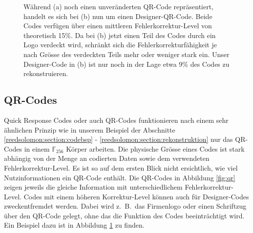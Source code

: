 \begin{figure}
	\centering
	\caption{Während (a) noch einen unveränderten QR-Code repräsentiert, handelt es sich bei (b) nun um einen Designer-QR-Code. Beide Codes verfügen über einen mittleren Fehlerkorrektur-Level von theoretisch 15\%. Da bei (b) jetzt einen Teil des Codes durch ein Logo verdeckt wird, schränkt sich die Fehlerkorrekturfähigkeit je nach Grösse des verdeckten Teils mehr oder weniger stark ein. Unser Designer-Code in (b) ist nur noch in der Lage etwa 9\% des Codes zu rekonstruieren.}
	\label{fig:designqr}
\end{figure}

\subsection{QR-Codes}
%
Quick Response Codes oder auch QR-Codes funktionieren nach einem sehr ähnlichen Prinzip wie in unserem Beispiel der Abschnitte \ref{reedsolomon:section:codebsp} - \ref{reedsolomon:section:rekonstruktion} nur das QR-Codes in einem $\mathbb{F}_{256}$ Körper arbeiten.
Die physische Grösse eines Codes ist stark abhängig von der Menge an codierten Daten sowie dem verwendeten Fehlerkorrektur-Level.
Es ist so auf dem ersten Blick nicht ersichtlich, wie viel Nutzinformationen ein QR-Code enthält.
Die QR-Codes in Abbildung \ref{fig:qr} zeigen jeweils die gleiche Information mit unterschiedlichem Fehlerkorrektur-Level.
Codes mit einem höheren Korrektur-Level können auch für Designer-Codes zweckentfremdet werden.
%
Dabei wird z.~B.~das Firmenlogo oder einen Schriftzug über den QR-Code gelegt, ohne das die Funktion des Codes beeinträchtigt wird. Ein Beispiel dazu ist in Abbildung \ref{fig:designqr} zu finden. 

